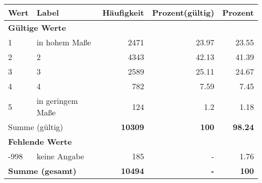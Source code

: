      \begin{longtable}{lXrrr}
     \toprule
     \textbf{Wert} & \textbf{Label} & \textbf{Häufigkeit} & \textbf{Prozent(gültig)} & \textbf{Prozent} \\
     \endhead
     \midrule
     \multicolumn{5}{l}{\textbf{Gültige Werte}}\\

     1 &
     \multicolumn{1}{X}{ in hohem Maße   } &


       \num{2471} &
       \num[round-mode=places,round-precision=2]{23.97} &
         \num[round-mode=places,round-precision=2]{23.55} \\

     2 &
     \multicolumn{1}{X}{ 2   } &


       \num{4343} &
       \num[round-mode=places,round-precision=2]{42.13} &
         \num[round-mode=places,round-precision=2]{41.39} \\

     3 &
     \multicolumn{1}{X}{ 3   } &


       \num{2589} &
       \num[round-mode=places,round-precision=2]{25.11} &
         \num[round-mode=places,round-precision=2]{24.67} \\

     4 &
     \multicolumn{1}{X}{ 4   } &


       \num{782} &
       \num[round-mode=places,round-precision=2]{7.59} &
         \num[round-mode=places,round-precision=2]{7.45} \\

     5 &
     \multicolumn{1}{X}{ in geringem Maße   } &


       \num{124} &
       \num[round-mode=places,round-precision=2]{1.2} &
         \num[round-mode=places,round-precision=2]{1.18} \\
     \midrule
     \multicolumn{2}{l}{Summe (gültig)} &
       \textbf{\num{10309}} &
     \textbf{\num{100}} &
       \textbf{\num[round-mode=places,round-precision=2]{98.24}} \\
     \multicolumn{5}{l}{\textbf{Fehlende Werte}}\\
       -998 &
       keine Angabe &
         \num{185} &
        - &
         \num[round-mode=places,round-precision=2]{1.76} \\
     \midrule
     \multicolumn{2}{l}{\textbf{Summe (gesamt)}} &
          \textbf{\num{10494}} &
        \textbf{-} &
        \textbf{\num{100}} \\
     \bottomrule
     \end{longtable}
     
